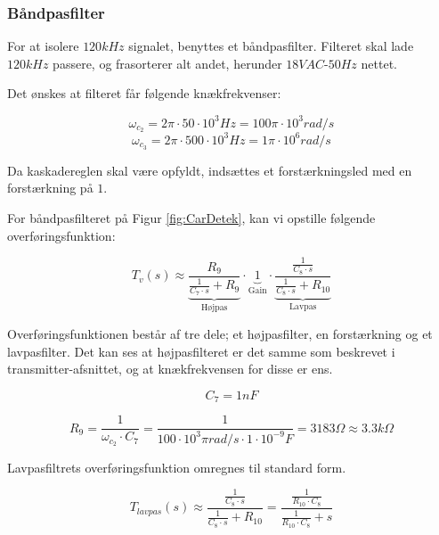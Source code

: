 \subsubsection{Båndpasfilter}

For at isolere $120kHz$ signalet, benyttes et båndpasfilter. Filteret skal lade $120kHz$ passere, og frasorterer alt andet, herunder $18VAC$-$50Hz$ nettet.

Det ønskes at filteret får følgende knækfrekvenser:

\begin{displaymath}
\omega_{c_{2}} = 2 \pi \cdot 50 \cdot 10^3 Hz = 100\pi \cdot 10^{3} rad/s
\end{displaymath}
\begin{displaymath}
\omega_{c_{3}} = 2 \pi \cdot 500 \cdot 10^3 Hz = 1\pi \cdot 10^{6} rad/s
\end{displaymath}

Da kaskadereglen skal være opfyldt, indsættes et forstærkningsled med en forstærkning på $1$.

For båndpasfilteret på Figur \ref{fig:CarDetek}, kan vi opstille følgende overføringsfunktion:

\begin{displaymath}
T_{v}(s)\approx \underbrace{\dfrac{R_{9}}{\tfrac{1}{C_{7}\cdot s}+R_{9}}}_\text{Højpas} \cdot
\underbrace{1}_\text{Gain} \cdot
\underbrace{\dfrac{ \tfrac{ 1 }{C_{8}\cdot s}}{ \tfrac{ 1 }{C_{8}\cdot s }+ R_{10}}}_\text{Lavpas}
\end{displaymath}

Overføringsfunktionen består af tre dele; et højpasfilter, en forstærkning og et lavpasfilter. Det kan ses at højpasfilteret er det samme som beskrevet i transmitter-afsnittet, og at knækfrekvensen for disse er ens.

\begin{displaymath}
C_{7} = 1nF
\end{displaymath}

\begin{displaymath}
R_{9} = \dfrac{1}{\omega_{c_{2}} \cdot C_{7}} = \dfrac{1}{100\cdot 10^{3}\pi rad/s \cdot 1\cdot 10^{-9}F} = 3183 \Omega \approx 3.3k\Omega
\end{displaymath}

Lavpasfiltrets overføringsfunktion omregnes til standard form.

\begin{displaymath}
T_{lavpas}(s)\approx \dfrac{ \tfrac{ 1 }{C_{8}\cdot s}}{ \tfrac{ 1 }{C_{8}\cdot s }+ R_{10}} = 
\dfrac{ \tfrac{ 1 }{ R_{10} \cdot C_{8}} }{ \tfrac{ 1 }{ R_{10} \cdot C_{8}} +s }
\end{displaymath}

